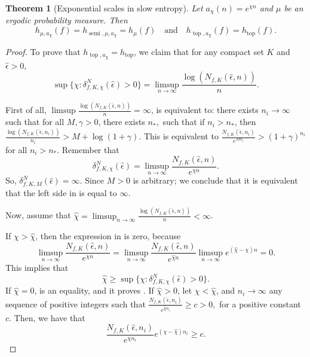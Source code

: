\documentclass[oneside]{amsart}
\theoremstyle{plain}
\newtheorem{THM}{Theorem}[section]
\theoremstyle{definition}
\newcommand{\<}{\langle}
\renewcommand{\>}{\rangle}
\newcommand{\e}{\epsilon}
\newcommand{\topo}{\operatorname{top}}
\renewcommand{\|}{|\!|} %
\newcommand{\semitop}{\operatorname{semi}} %
\begin{document}
\begin{THM}[Exponential scales in slow entropy]
\label{thm:ExponentialScales}
Let $a_\chi(n) = e^{\chi n}$ and $\mu$ be an ergodic probability measure. Then 
\begin{equation*}
    h_{\mu,a_{\chi}}(f) = h_{\semitop,\mu,a_\chi}= h_\mu(f) \quad \text{and} \quad  h_{\topo,a_\chi}(f) =  h_{\topo}(f).
\end{equation*} 
\end{THM}


\begin{proof} 
 To prove that $h_{\topo,a_\chi} = h_{\topo}$, we claim that for any compact set $K$ and $\hat{\e}>0$,
\begin{equation} 
    \sup\{\chi : \delta^N_{f,K,\chi}(\hat{\e})>0\} = \limsup_{n \to \infty} \frac{\log(N_{f,K}(\hat{\e},n))}{n}. 
\label{eq:ExponentialEquivalence}
\end{equation}

First of all, $\limsup\frac{\log(N_{f,K}(\hat{\e},n))}{n}= \infty$, is equivalent to: there exists $n_i \to \infty $ such that for all $M,\gamma >0$, there exists $n_*,$ such that if $n_i > n_*$, then $\frac{\log(N_{f,K}(\hat{\e},n_i))}{n_i} > M+ \log(1+\gamma)$. This is equivalent to $\frac{N_{f,K}(\hat{\e},n_i)}{e^{Mn_i}}>(1+\gamma)^{n_i}$ for all $n_i>n_*.$ 
Remember that 
\begin{equation}
    \delta^N_{f,K,\chi}(\hat{\e}) = \limsup_{n \to \infty} \frac{N_{f,K}(\hat{\e},n)}{e^{\chi n}}.
    \label{eq:DeltaNEhat}
\end{equation}
% 
So, $\delta_{f,K,M}^N(\hat{\e}) =\infty.$ Since $M>0$ is arbitrary; we conclude that it is equivalent that the left side in  is equal to $\infty.$

Now, assume that $\hat{\chi} = \limsup_{n \to \infty} \frac{\log(N_{f,K}(\hat{\e},n))}{n} < \infty$.

If $\chi > \hat{\chi}$, then the expression in  is zero, because 
\begin{equation}
 \limsup_{n\to \infty}\frac{N_{f,K}(\hat{\e},n)}{e^{\chi n}}  =  \limsup_{n \to \infty}\frac{N_{f,K}(\hat{\e},n)}{e^{\hat{\chi} n}}\limsup_{n\to \infty}e^{(\hat{\chi} - \chi)n} = 0.
\end{equation}
This implies that
\begin{equation}
    \hat{\chi} \geq  \sup \{\chi: \delta^N_{f,K,\chi}(\hat{\e})>0\}.
    \label{eq:BoundOnSup}
\end{equation}
If $\hat{\chi} = 0$,  is an equality, and it proves . If $\hat{\chi}>0$,  let $\chi < \hat{\chi}$, and $n_i \to  \infty$ any sequence of positive integers such that $\frac{N_{f,K}(\hat{\e},n_i)}{e^{\hat{\chi} n_i}} \geq c > 0,$ for a positive constant $c$. Then,
we have that 
\begin{equation}
    \frac{N_{f,K}(\hat{\e},n_i)}{e^{\chi n_i}}  e^{(\chi - \hat{\chi})n_i} \geq c.
\end{equation}


\end{proof}
\end{document}
